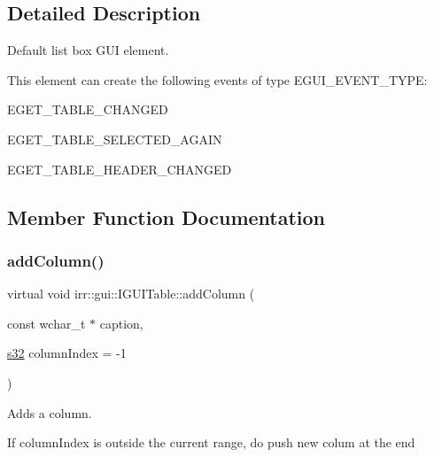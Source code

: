 \subsection{Detailed Description}
Default list box G\+UI element. 

\begin{DoxyParagraph}{This element can create the following events of type E\+G\+U\+I\+\_\+\+E\+V\+E\+N\+T\+\_\+\+T\+Y\+PE\+:}
\begin{DoxyItemize}
\item E\+G\+E\+T\+\_\+\+T\+A\+B\+L\+E\+\_\+\+C\+H\+A\+N\+G\+ED \item E\+G\+E\+T\+\_\+\+T\+A\+B\+L\+E\+\_\+\+S\+E\+L\+E\+C\+T\+E\+D\+\_\+\+A\+G\+A\+IN \item E\+G\+E\+T\+\_\+\+T\+A\+B\+L\+E\+\_\+\+H\+E\+A\+D\+E\+R\+\_\+\+C\+H\+A\+N\+G\+ED \end{DoxyItemize}

\end{DoxyParagraph}


\subsection{Member Function Documentation}
\mbox{\label{classirr_1_1gui_1_1IGUITable_a6ae4360ca563f13a178e69653187e7f6}} 
\subsubsection{\texorpdfstring{add\+Column()}{addColumn()}}
{\footnotesize\ttfamily virtual void irr\+::gui\+::\+I\+G\+U\+I\+Table\+::add\+Column (\begin{DoxyParamCaption}\item[{const wchar\+\_\+t $\ast$}]{caption,  }\item[{\hyperlink{namespaceirr_ac66849b7a6ed16e30ebede579f9b47c6}{s32}}]{column\+Index = {\ttfamily -\/1} }\end{DoxyParamCaption})\hspace{0.3cm}{\ttfamily [pure virtual]}}



Adds a column. 

If column\+Index is outside the current range, do push new colum at the end \mbox{\label{classirr_1_1gui_1_1IGUITable_a2cd5f569985f88c6fe55d99a86b79ca8}} 
